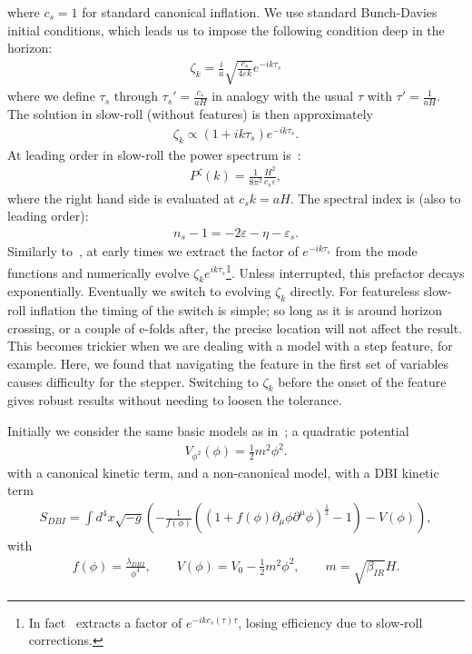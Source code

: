 \documentclass[a4paper,12pt]{extarticle}
\newcommand{\quadpot}{V_{\phi^2}(\phi)}
\begin{document}
where $c_s=1$ for standard canonical inflation.
We use standard Bunch-Davies initial conditions,
which leads us to impose the following condition deep in the horizon:
\begin{align}\label{bd_ic}
\zeta_k = \frac{i}{a}\sqrt{\frac{c_s}{4\varepsilon k}} e^{-ik\tau_s}
\end{align}
where we define $\tau_s$ through $\tau_s'=\frac{c_s}{aH}$
in analogy with the usual $\tau$ with $\tau'=\frac{1}{aH}$.
The solution in slow-roll (without features) is then approximately
\begin{align}\label{modefnsapprox}
    \zeta_k \propto (1+ik\tau_s)e^{-ik\tau_s}.
\end{align}
At leading order in slow-roll the power spectrum is~\cite{mukhanov_1999,chen_ng_0605}:
\begin{align}
P^{\zeta}(k) = \frac{1}{8\pi^2}\frac{H^2}{c_s\varepsilon},
\end{align}
where the right hand side is evaluated at $c_{s}k=aH$.
The spectral index is (also to leading order):
\begin{align}
n_s-1 = -2\varepsilon-\eta-\varepsilon_s.
\end{align}
Similarly to~\cite{Funakoshi}, at early times we extract the factor of $e^{-ik\tau_s}$ from the mode functions
and numerically evolve $\zeta_ke^{ik\tau_s}$\footnote{
    In fact~\cite{Funakoshi} extracts a factor of $e^{-ikc_s(\tau)\tau}$, losing efficiency
    due to slow-roll corrections.
}.
Unless interrupted, this prefactor decays exponentially.
Eventually we switch to evolving $\zeta_k$ directly.
For featureless slow-roll inflation the timing of the switch is simple;
so long as it is around horizon crossing, or a couple of e-folds after,
the precise location will not affect the result.
This becomes trickier when we are dealing with a model with
a step feature, for example.
Here, we found that navigating the feature in the first set of variables
causes difficulty for the stepper.
Switching to $\zeta_k$ before the onset of the feature
gives robust results without needing to loosen the tolerance.


Initially we consider the same basic models as in~\cite{Funakoshi};
a quadratic potential
\begin{align}\label{eq:quadratic_potential}
    \quadpot = \frac{1}{2}m^2\phi^2.
\end{align}
with a canonical kinetic term,
and a non-canonical model, with a DBI
kinetic term
\begin{align}\label{eq:dbi_action}
    S_{DBI}=\int d^4x\sqrt{-g}\left(-\frac{1}{f(\phi)}\left(\left(1+f(\phi)\partial_\mu\phi\partial^\mu\phi\right)^{\frac{1}{2}}-1\right)-V(\phi)\right),
\end{align}
with
\begin{align}\label{eq:dbi_warp}
    f(\phi)=\frac{\lambda_{DBI}}{\phi^4},\qquad
    V(\phi)=V_0-\frac{1}{2}m^2\phi^2,\qquad
    m=\sqrt{\beta_{IR}}H.
\end{align}
\end{document}

